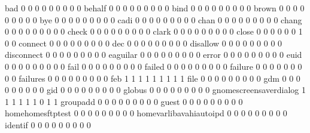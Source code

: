 \documentclass[compress,8pt]{beamer}
\begin{document}
\begin{frame}
\begin{Schunk}
  bad                                        0   0   0   0   0   0   0   0   0
  behalf                                     0   0   0   0   0   0   0   0   0
  bind                                       0   0   0   0   0   0   0   0   0
  brown                                      0   0   0   0   0   0   0   0   0
  bye                                        0   0   0   0   0   0   0   0   0
  cadi                                       0   0   0   0   0   0   0   0   0
  chan                                       0   0   0   0   0   0   0   0   0
  chang                                      0   0   0   0   0   0   0   0   0
  check                                      0   0   0   0   0   0   0   0   0
  clark                                      0   0   0   0   0   0   0   0   0
  close                                      0   0   0   0   0   0   1   0   0
  connect                                    0   0   0   0   0   0   0   0   0
  dec                                        0   0   0   0   0   0   0   0   0
  disallow                                   0   0   0   0   0   0   0   0   0
  disconnect                                 0   0   0   0   0   0   0   0   0
  eaguilar                                   0   0   0   0   0   0   0   0   0
  error                                      0   0   0   0   0   0   0   0   0
  euid                                       0   0   0   0   0   0   0   0   0
  fail                                       0   0   0   0   0   0   0   0   0
  failed                                     0   0   0   0   0   0   0   0   0
  failure                                    0   0   0   0   0   0   0   0   0
  failures                                   0   0   0   0   0   0   0   0   0
  feb                                        1   1   1   1   1   1   1   1   1
  file                                       0   0   0   0   0   0   0   0   0
  gdm                                        0   0   0   0   0   0   0   0   0
  gid                                        0   0   0   0   0   0   0   0   0
  globus                                     0   0   0   0   0   0   0   0   0
  gnomescreensaverdialog                     1   1   1   1   1   1   0   1   1
  groupadd                                   0   0   0   0   0   0   0   0   0
  guest                                      0   0   0   0   0   0   0   0   0
  homehomesftptest                           0   0   0   0   0   0   0   0   0
  homevarlibavahiautoipd                     0   0   0   0   0   0   0   0   0
  identif                                    0   0   0   0   0   0   0   0   0

\end{Schunk}
\end{frame}
\end{document}
